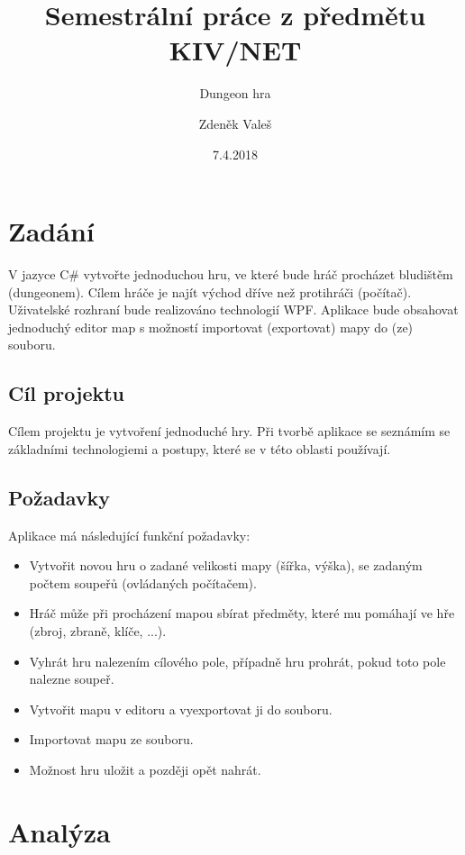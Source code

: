 \documentclass[11pt,a4paper]{scrartcl}
\begin{document}
	\title{Semestrální práce z předmětu KIV/NET}
	\subtitle{Dungeon hra}
	\author{Zdeněk Valeš}
	\date{7.4.2018}
	\maketitle
	\newpage
	
	\section{Zadání}
	V jazyce C\# vytvořte jednoduchou hru, ve které bude hráč procházet bludištěm (dungeonem). Cílem hráče je najít východ dříve než protihráči (počítač). Uživatelské rozhraní bude realizováno technologií WPF. Aplikace bude obsahovat jednoduchý editor map s možností importovat (exportovat) mapy do (ze) souboru.
	
	\subsection{Cíl projektu}
	Cílem projektu je vytvoření jednoduché hry. Při tvorbě aplikace se seznámím se základními technologiemi a postupy, které se v této oblasti používají.
	
	\subsection{Požadavky}
	Aplikace má následující funkční požadavky:
	\begin{itemize}
		\item Vytvořit novou hru o zadané velikosti mapy (šířka, výška), se zadaným počtem soupeřů (ovládaných počítačem).
		
		\item Hráč může při procházení mapou sbírat předměty, které mu pomáhají ve hře (zbroj, zbraně, klíče, ...).
		
		\item Vyhrát hru nalezením cílového pole, případně hru prohrát, pokud toto pole nalezne soupeř.
		
		\item Vytvořit mapu v editoru a vyexportovat ji do souboru.
		
		\item Importovat mapu ze souboru.
		
		\item Možnost hru uložit a později opět nahrát.
	\end{itemize}
	
	\section{Analýza}
	
\end{document}
